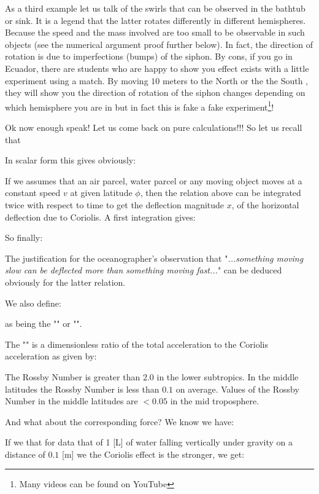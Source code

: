	As a third example let us talk of the swirls that can be observed in the bathtub or sink. It is a legend that the latter rotates differently in different hemispheres. Because the speed and the mass involved are too small to be observable in such objects (see the numerical argument proof further below). In fact, the direction of rotation is due to imperfections (bumps) of the siphon. By cons, if you go in Ecuador, there are students who are happy to show you effect exists with a little experiment using a match. By moving $10$ meters to the North or the the South , they will show you the direction of rotation of the siphon changes depending on which hemisphere you are in but in fact this is fake a fake experiment\footnote{Many videos can be found on YouTube}!
	
	Ok now enough speak! Let us come back on pure calculations!!! So let us recall that
	
	In scalar form this gives obviously:
	
	If we assumes that an air parcel, water parcel or any moving object moves at a constant speed $v$ at given latitude $\phi$, then the relation above can be integrated twice with respect to time to get the deflection magnitude $x$, of the horizontal deflection due to Coriolis. A first integration gives:
	
	So finally:
	
	 The justification for the oceanographer's observation that "\textit{...something moving slow can be deflected more than something moving fast...}" can be deduced obviously for the latter relation.
	 
	 We also define:
	
	as being the "" or "".
	
	The "" is a dimensionless ratio of the total acceleration to the Coriolis acceleration as given by:
	
	The Rossby Number is greater than $2.0$ in the lower subtropics.  In the middle latitudes the Rossby Number is less than $0.1$ on average.  Values of the Rossby Number in the middle latitudes are $<0.05$ in the mid troposphere. 
	
	And what about the corresponding force? We know we have:
	
	If we that for data that of 1 [L] of water falling vertically under gravity on a distance of $0.1$ [m] we the Coriolis effect is the stronger, we get:
	
